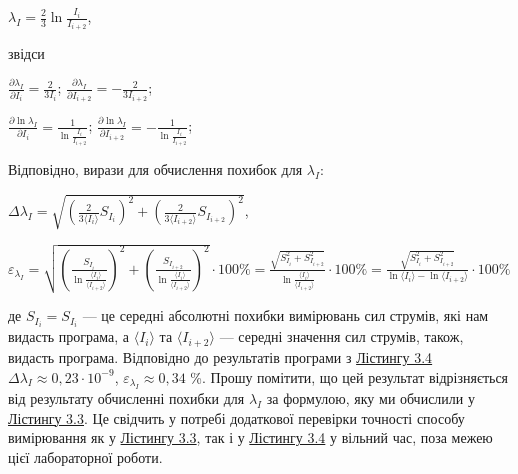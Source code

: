 \documentclass[12pt,a4paper]{article}
\begin{document}
    \begin{center}
        $\displaystyle \lambda_I = \frac{2}{3} \ln \frac{I_i}{I_{i+2}}$,
    \end{center}

    звідси

    \begin{center}
        $\displaystyle \frac{\partial \lambda_I}{\partial I_i} = \frac{2}{3I_i}$; $\displaystyle \frac{\partial \lambda_I}{\partial I_{i+2}} = -\frac{2}{3I_{i+2}}$;
    \end{center}

    \begin{center}
        $\displaystyle \frac{\partial \ln \lambda_I}{\partial I_i} = \frac{1}{\ln \frac{I_i}{I_{i+2}}}$; $\displaystyle \frac{\partial \ln \lambda_I}{\partial I_{i+2}} = -\frac{1}{\ln \frac{I_i}{I_{i+2}}}$;
    \end{center}

    Відповідно, вирази для обчислення похибок для $\lambda_I$:

    \begin{center}
        $\displaystyle \Delta \lambda_I = \sqrt{\left( \frac{2}{3\text{⟨}I_i\text{⟩}} S_{I_i} \right)^2 + \left( \frac{2}{3\text{⟨}I_{i+2}\text{⟩}} S_{I_{i+2}}\right)^2}$,
    \end{center}

    \begin{center}
        $\displaystyle \varepsilon_{\lambda_I} = \sqrt{\left( \frac{S_{I_i}}{\ln \frac{\text{⟨}I_i\text{⟩}}{\text{⟨}I_{i+2}\text{⟩}}}\right)^2 + \left( \frac{S_{I_{i+2}}}{\ln \frac{\text{⟨}I_i\text{⟩}}{\text{⟨}I_{i+2}\text{⟩}}} \right)^2} \cdot 100 \% =
        \frac{\sqrt{S_{I_i}^2 + S_{I_{i+2}}^2}}{\ln \frac{\text{⟨}I_i\text{⟩}}{\text{⟨}I_{i+2}\text{⟩}}} \cdot 100 \% = \frac{\sqrt{S_{I_i}^2 + S_{I_{i+2}}^2}}{\ln \text{⟨}I_i\text{⟩} - \ln \text{⟨}I_{i+2}\text{⟩}} \cdot 100 \%$
    \end{center}

    де $S_{I_i} = S_{I_i}$ --- це середні абсолютні похибки вимірювань сил струмів, які нам видасть програма, а $\text{⟨}I_i\text{⟩}$ та $\text{⟨}I_{i+2}\text{⟩}$ --- середні значення сил струмів, також, видасть програма.
    Відповідно до результатів програми з \hyperlink{listing4}{Лістингу 3.4} $\Delta \lambda_I \approx 0,23 \cdot 10^{-9}$, $\varepsilon_{\lambda_I} \approx 0,34$ \%. Прошу помітити, що цей результат відрізняється від результату обчисленні похибки для $\lambda_I$ за формулою, яку ми обчислили у \hyperlink{listing3}{Лістингу 3.3}.
    Це свідчить у потребі додаткової перевірки точності способу вимірювання як у \hyperlink{listing3}{Лістингу 3.3}, так і у \hyperlink{listing4}{Лістингу 3.4} у вільний час, поза межею цієї лабораторної роботи.
\end{document}
